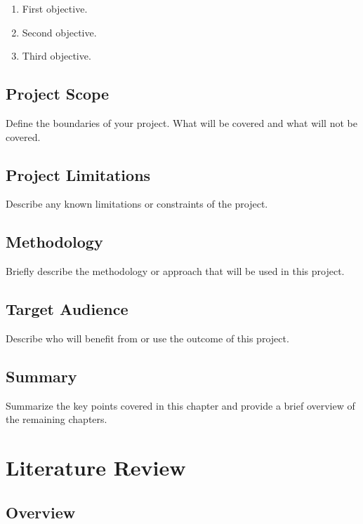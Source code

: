 \documentclass[
]{fypStandard}
\providecommand{\tightlist}{%
  \setlength{\itemsep}{0pt}\setlength{\parskip}{0pt}}
\begin{document}
\begin{enumerate}
\def\labelenumi{\arabic{enumi}.}
\tightlist
\item
  First objective.
\item
  Second objective.
\item
  Third objective.
\end{enumerate}

\section{Project Scope}\label{project-scope}

Define the boundaries of your project. What will be covered and what
will not be covered.

\section{Project Limitations}\label{project-limitations}

Describe any known limitations or constraints of the project.

\section{Methodology}\label{methodology}

Briefly describe the methodology or approach that will be used in this
project.

\section{Target Audience}\label{target-audience}

Describe who will benefit from or use the outcome of this project.

\section{Summary}\label{summary}

Summarize the key points covered in this chapter and provide a brief
overview of the remaining chapters.

\chapter{Literature Review}\label{literature-review}

\section{Overview}\label{overview-1}
\end{document}
